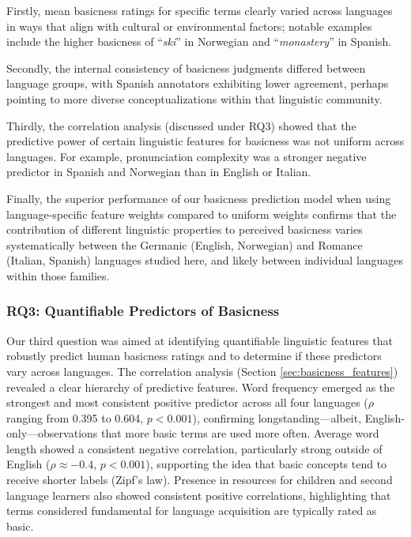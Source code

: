 \documentclass[preprint,12pt,authoryear]{elsarticle}
\begin{document}
Firstly, mean basicness ratings for specific terms clearly varied across languages in ways that align with cultural or environmental factors; notable examples include the higher basicness of ``\textit{ski}'' in Norwegian and ``\textit{monastery}'' in Spanish.

Secondly, the internal consistency of basicness judgments differed between language groups, with Spanish annotators exhibiting lower agreement, perhaps pointing to more diverse conceptualizations within that linguistic community.

Thirdly, the correlation analysis (discussed under RQ3) showed that the predictive power of certain linguistic features for basicness was not uniform across languages. For example, pronunciation complexity was a stronger negative predictor in Spanish and Norwegian than in English or Italian.

Finally, the superior performance of our basicness prediction model when using language-specific feature weights compared to uniform weights confirms that the contribution of different linguistic properties to perceived basicness varies systematically between the Germanic (English, Norwegian) and Romance (Italian, Spanish) languages studied here, and likely between individual languages within those families.

\subsubsection{RQ3: Quantifiable Predictors of Basicness}
Our third question was aimed at identifying quantifiable linguistic features that robustly predict human basicness ratings and to determine if these predictors vary across languages. The correlation analysis (Section \ref{sec:basicness_features}) revealed a clear hierarchy of predictive features. Word frequency emerged as the strongest and most consistent positive predictor across all four languages ($\rho$ ranging from 0.395 to 0.604, $p < 0.001$), confirming longstanding---albeit, English-only---observations that more basic terms are used more often. Average word length showed a consistent negative correlation, particularly strong outside of English ($\rho \approx -0.4$, $p < 0.001$), supporting the idea that basic concepts tend to receive shorter labels (Zipf's law). Presence in resources for children and second language learners also showed consistent positive correlations, highlighting that terms considered fundamental for language acquisition are typically rated as basic.
\end{document}
